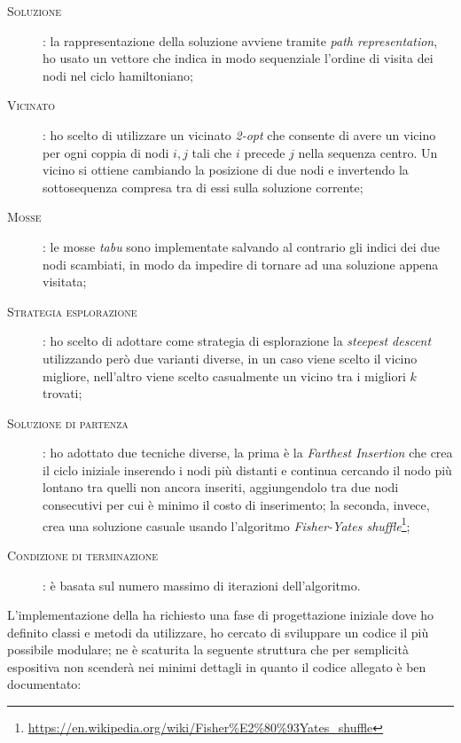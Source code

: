\begin{description}
\item[\textsc{Soluzione}]: la rappresentazione della soluzione avviene tramite \emph{path representation}, ho usato un vettore che indica in modo sequenziale l'ordine di visita dei nodi nel ciclo hamiltoniano;
\item[\textsc{Vicinato}]: ho scelto di utilizzare un vicinato \emph{2-opt} che consente di avere un vicino per ogni coppia di nodi $i, j$ tali che $i$ precede $j$ nella sequenza centro.
Un vicino si ottiene cambiando la posizione di due nodi e invertendo la sottosequenza compresa tra di essi sulla soluzione corrente;
\item[\textsc{Mosse}]: le mosse \emph{tabu} sono implementate salvando al contrario gli indici dei due nodi scambiati, in modo da impedire di tornare ad una soluzione appena visitata;
\item[\textsc{Strategia esplorazione}]: ho scelto di adottare come strategia di esplorazione la \emph{steepest descent} utilizzando però due varianti diverse, in un caso viene scelto il vicino migliore, nell'altro viene scelto casualmente un vicino tra i migliori $k$ trovati;
\item[\textsc{Soluzione di partenza}]: ho adottato due tecniche diverse, la prima è la \emph{Farthest Insertion} che crea il ciclo iniziale inserendo i nodi più distanti e continua cercando il nodo più lontano tra quelli non ancora inseriti, aggiungendolo tra due nodi consecutivi per cui è minimo il costo di inserimento; la seconda, invece, crea una soluzione casuale usando l'algoritmo \emph{Fisher-Yates shuffle}\footnote{\url{https://en.wikipedia.org/wiki/Fisher\%E2\%80\%93Yates_shuffle}};
\item[\textsc{Condizione di terminazione}]: è basata sul numero massimo di iterazioni dell'algoritmo.
\end{description}

L'implementazione della \tabu ha richiesto una fase di progettazione iniziale dove ho definito classi e metodi da utilizzare, ho cercato di sviluppare un codice il più possibile modulare; ne è scaturita la seguente struttura che per semplicità espositiva non scenderà nei minimi dettagli in quanto il codice allegato è ben documentato:

